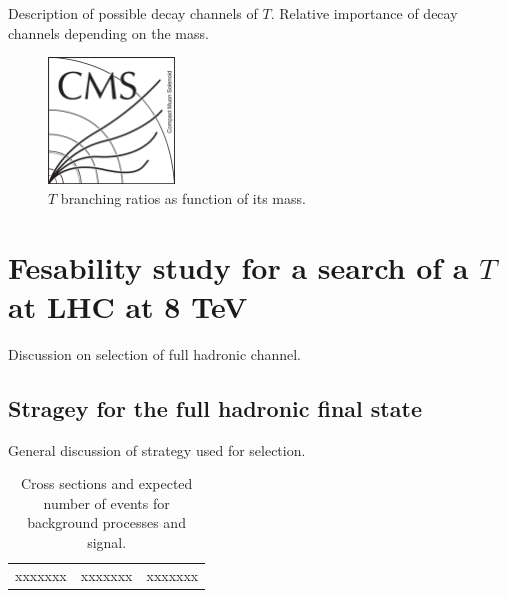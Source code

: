 Description of possible decay channels of $T$. Relative importance of decay channels depending on the mass. 

\begin{figure}[!Hhtbp]
  \begin{center}
    \includegraphics[width=0.3\textwidth]{figs/CMSlogo.png}
    \caption{$T$ branching ratios as function of its mass.}
    \label{fig:TBRs}
  \end{center}
\end{figure}

\section{Fesability study for a search of a $T$ at LHC at 8 TeV}
\label{sec:pheno}

Discussion on selection of full hadronic channel.

\subsection{Stragey for the full hadronic final state}
\label{sec:Pstra}

General discussion of strategy used for selection. 

\begin{table}[htbH]
\label{tab:BKGS}
\begin{center}
\begin{tabular}{|c|c|c|}
xxxxxxx & xxxxxxx & xxxxxxx
\end{tabular}
\caption{Cross sections and expected number of events for background processes and signal.}
\end{center}
\end{table}

